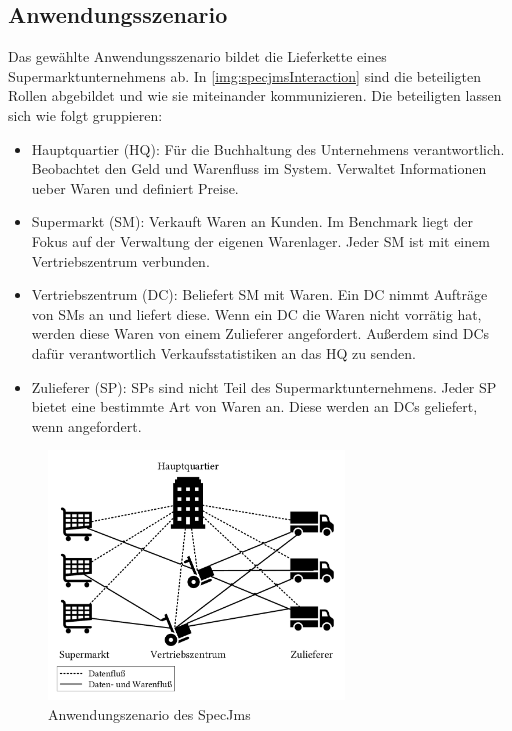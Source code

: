 \subsection{Anwendungsszenario}
Das gewählte Anwendungsszenario bildet die Lieferkette eines Supermarktunternehmens ab. In \autoref{img:specjmsInteraction} sind die beteiligten Rollen abgebildet und wie sie miteinander kommunizieren. Die beteiligten lassen sich wie folgt gruppieren: 
\begin{itemize}
    \item Hauptquartier (HQ): Für die Buchhaltung des Unternehmens verantwortlich. Beobachtet den Geld und Warenfluss im System. Verwaltet Informationen ueber Waren und definiert Preise.
    \item Supermarkt (SM): Verkauft Waren an Kunden. Im Benchmark liegt der Fokus auf der Verwaltung der eigenen Warenlager. Jeder SM ist mit einem Vertriebszentrum verbunden.
    \item Vertriebszentrum (DC): Beliefert SM mit Waren. Ein DC nimmt Aufträge von SMs an und liefert diese. Wenn ein DC die Waren nicht vorrätig hat, werden diese Waren von einem Zulieferer angefordert. Außerdem sind DCs dafür verantwortlich Verkaufsstatistiken an das HQ zu senden.
    \item Zulieferer (SP): SPs sind nicht Teil des Supermarktunternehmens. Jeder SP bietet eine bestimmte Art von Waren an. Diese werden an DCs geliefert, wenn angefordert.
\end{itemize}

\begin{figure}
\center
  \includegraphics[width=0.7\textwidth]{images/evaluation/specjms/specjmsOverview.pdf}
  \caption{Anwendungszenario des SpecJms}
  \label{img:specjmsInteraction}
\end{figure}

